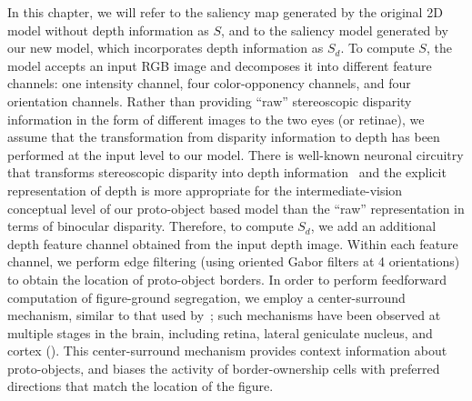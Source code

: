 In this chapter, we will refer to the saliency map generated by the original 2D model without depth information as $S$, and to the saliency model generated by our new model, which incorporates depth information as $S_d$. To compute $S$, the model accepts an input RGB image and decomposes it into different feature channels: one intensity channel, four color-opponency channels, and four orientation channels. Rather than providing ``raw'' stereoscopic disparity information in the form of different images to the two eyes (or retinae), we assume that the transformation from disparity information to depth has been performed at the input level to our model. There is well-known neuronal circuitry that transforms stereoscopic disparity into depth information~\cite[\eg][]{Poggio_Poggio84} and the explicit representation of depth is more appropriate for the intermediate-vision conceptual level of our proto-object based model than the ``raw'' representation in terms of binocular disparity. Therefore, to compute $S_d$, we add an additional depth feature channel obtained from the input depth image. Within each feature channel, we perform edge filtering (using oriented Gabor filters at 4 orientations) to obtain the location of proto-object borders. In order to perform feedforward computation of figure-ground segregation, we employ a center-surround mechanism, similar to that used by~\cite{Itti_etal98a}; such mechanisms have been observed at multiple stages in the brain, including retina, lateral geniculate nucleus, and cortex (\ibid). This center-surround mechanism provides context information about proto-objects, and biases the activity of border-ownership cells with preferred directions that match the location of the figure.

